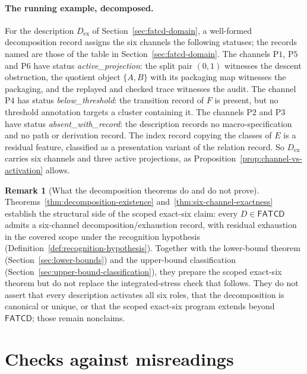 \documentclass[11pt]{article}
\theoremstyle{definition}
\newtheorem{remark}[theorem]{Remark}
\newcommand{\FATCD}{\ensuremath{\mathsf{FATCD}}}
\newcommand{\activeproj}{\textit{active\_\allowbreak projection}}
\newcommand{\belowthr}{\textit{below\_\allowbreak threshold}}
\newcommand{\absentrec}{\textit{absent\_\allowbreak with\_\allowbreak record}}
\newcommand{\Pone}{\ensuremath{\mathrm{P1}}}
\newcommand{\Ptwo}{\ensuremath{\mathrm{P2}}}
\newcommand{\Pthree}{\ensuremath{\mathrm{P3}}}
\newcommand{\Pfour}{\ensuremath{\mathrm{P4}}}
\newcommand{\Pfive}{\ensuremath{\mathrm{P5}}}
\newcommand{\Psix}{\ensuremath{\mathrm{P6}}}
\begin{document}
\paragraph{The running example, decomposed.} For the description
\(D_{\mathrm{ex}}\) of Section~\ref{sec:fatcd-domain}, a well-formed
decomposition record assigns the six channels the following statuses; the
records named are those of the table in Section~\ref{sec:fatcd-domain}. The
channels \Pone{}, \Pfive{} and \Psix{} have status \activeproj{}: the split pair
\((0,1)\) witnesses the descent obstruction, the quotient object \(\{A,B\}\)
with its packaging map witnesses the packaging, and the replayed and checked
trace witnesses the audit. The channel \Pfour{} has status \belowthr{}: the
transition record of \(F\) is present, but no threshold annotation targets a
cluster containing it. The channels \Ptwo{} and \Pthree{} have status \absentrec{}: the
description records no macro-specification and no path or derivation record. The index
record copying the classes of \(E\) is a residual feature, classified as a
presentation variant of the relation record. So \(D_{\mathrm{ex}}\) carries six
channels and three active projections, as Proposition~\ref{prop:channel-vs-activation}
allows.

\begin{remark}[What the decomposition theorems do and do not prove]\label{rem:dec-scope}
Theorems~\ref{thm:decomposition-existence}
and~\ref{thm:six-channel-exactness} establish the structural side of
the scoped exact-six claim: every \(D \in \FATCD{}\) admits a
six-channel decomposition/exhaustion record, with residual exhaustion in the
covered scope under the recognition hypothesis
(Definition~\ref{def:recognition-hypothesis}). Together with the lower-bound theorem
(Section~\ref{sec:lower-bounds}) and the upper-bound classification
(Section~\ref{sec:upper-bound-classification}), they prepare the
scoped exact-six theorem but do not replace the integrated-stress
check that follows. They do not assert that every description
activates all six roles, that the decomposition is canonical or
unique, or that the scoped exact-six program extends beyond \FATCD{};
those remain nonclaims.
\end{remark}

 \section{Checks against misreadings}\label{sec:integrated-stress}
\end{document}
